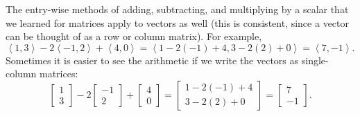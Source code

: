 The entry-wise methods of adding, subtracting, and multiplying by a scalar that we learned for matrices apply to vectors as well (this is consistent, since a vector can be thought of as a row or column matrix). For example, $$\left<1,3\right>-2\left<-1,2\right>+\left<4,0\right> = \left<1-2(-1)+4,3-2(2)+0\right> = \left<7,-1\right>.$$ 
Sometimes it is easier to see the arithmetic if we write the vectors as single-column matrices:
$$
\begin{bmatrix}1\\3\end{bmatrix}
-2\begin{bmatrix}-1\\ 2\end{bmatrix}
+ \begin{bmatrix}4\\0\end{bmatrix}
= \begin{bmatrix}1-2(-1)+4\\3-2(2)+0\end{bmatrix}
= \begin{bmatrix}7\\-1\end{bmatrix}.
$$

